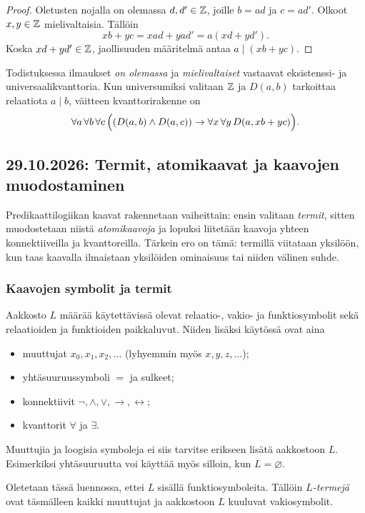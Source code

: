 \documentclass[11pt,a4paper]{amsart}
\begin{document}
\begin{proof}
  Oletusten nojalla on olemassa $d,d'\in\mathbb{Z}$, joille $b=ad$ ja $c=ad'$.
  Olkoot $x,y\in\mathbb{Z}$ mielivaltaisia. Tällöin
  \[
    xb+yc=xad+yad'=a(xd+yd').
  \]
  Koska $xd+yd'\in\mathbb{Z}$, jaollisuuden määritelmä antaa $a\mid(xb+yc)$.
\end{proof}

Todistuksessa ilmaukset \emph{on olemassa} ja \emph{mielivaltaiset}
vastaavat eksistenssi- ja universaalikvanttoria. Kun universumiksi
valitaan $\mathbb{Z}$ ja $D(a,b)$ tarkoittaa relaatiota $a\mid b$, väitteen
kvanttorirakenne on
\[
  \forall a\,\forall b\,\forall c\,
  \Bigl((D(a,b)\land D(a,c))\to
  \forall x\,\forall y\,D(a,xb+yc)\Bigr).
\]

\clearpage
\subsection{29.10.2026: Termit, atomikaavat ja kaavojen muodostaminen}

Predikaattilogiikan kaavat rakennetaan vaiheittain: ensin valitaan
\emph{termit}, sitten muodostetaan niistä \emph{atomikaavoja} ja lopuksi
liitetään kaavoja yhteen konnektiiveilla ja kvanttoreilla.
Tärkein ero on tämä: termillä viitataan yksilöön, kun taas kaavalla
ilmaistaan yksilöiden ominaisuus tai niiden välinen suhde.

\subsubsection{Kaavojen symbolit ja termit}

Aakkosto $L$ määrää käytettävissä olevat relaatio-, vakio- ja
funktiosymbolit sekä relaatioiden ja funktioiden paikkaluvut.
Niiden lisäksi käytössä ovat aina
\begin{itemize}
  \item muuttujat $x_0,x_1,x_2,\ldots$ (lyhyemmin myös $x,y,z,\ldots$);
  \item yhtäsuuruussymboli $=$ ja sulkeet;
  \item konnektiivit $\neg,\land,\lor,\to,\leftrightarrow$;
  \item kvanttorit $\forall$ ja $\exists$.
\end{itemize}
Muuttujia ja loogisia symboleja ei siis tarvitse erikseen lisätä
aakkostoon $L$. Esimerkiksi yhtäsuuruutta voi käyttää myös silloin,
kun $L=\varnothing$.

\begin{definition}
  Oletetaan tässä luennossa, ettei $L$ sisällä funktiosymboleita.
  Tällöin \emph{$L$-termejä} ovat täsmälleen kaikki muuttujat ja
  aakkostoon $L$ kuuluvat vakiosymbolit.
\end{definition}
\end{document}
